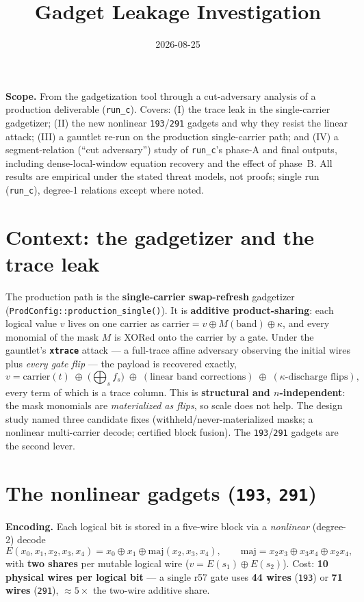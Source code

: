 \documentclass[11pt]{article}
\title{\bfseries Gadget Leakage Investigation}
\author{}
\date{2026-08-25}
\newcommand{\xor}{\oplus}
\newcommand{\code}[1]{\texttt{#1}}
\newcommand{\maj}{\mathrm{maj}}
\begin{document}
\maketitle
\vspace{-3em}

\noindent\textbf{Scope.} From the gadgetization tool through a cut-adversary
analysis of a production deliverable (\code{run\_c}). Covers: (I) the trace leak in
the single-carrier gadgetizer; (II) the new nonlinear \code{193}/\code{291} gadgets
and why they resist the linear attack; (III) a gauntlet re-run on the production
single-carrier path; and (IV) a segment-relation (``cut adversary'') study of
\code{run\_c}'s phase-A and final outputs, including dense-local-window equation
recovery and the effect of phase~B. All results are empirical under the stated
threat models, not proofs; single run (\code{run\_c}), degree-1 relations except
where noted.

\section{Context: the gadgetizer and the trace leak}

The production path is the \textbf{single-carrier swap-refresh} gadgetizer
(\code{ProdConfig::production\_single()}). It is \textbf{additive product-sharing}:
each logical value $v$ lives on one carrier as $\text{carrier} = v \xor M(\text{band})
\xor \kappa$, and every monomial of the mask $M$ is XORed onto the carrier by a gate.
Under the gauntlet's \textbf{\code{xtrace}} attack --- a full-trace affine adversary
observing the initial wires plus \emph{every gate flip} --- the payload is recovered
exactly,
\[
v = \text{carrier}(t) \;\xor\; \Big(\bigoplus_s f_s\Big) \;\xor\; (\text{linear band
corrections}) \;\xor\; (\kappa\text{-discharge flips}),
\]
every term of which is a trace column. This is \textbf{structural and
$n$-independent}: the mask monomials are \emph{materialized as flips}, so scale does
not help. The design study named three candidate fixes (withheld/never-materialized
masks; a nonlinear multi-carrier decode; certified block fusion). The
\code{193}/\code{291} gadgets are the second lever.

\section{The nonlinear gadgets (\code{193}, \code{291})}

\textbf{Encoding.} Each logical bit is stored in a five-wire block via a
\emph{nonlinear} (degree-2) decode
\[
E(x_0,x_1,x_2,x_3,x_4) = x_0 \xor x_1 \xor \maj(x_2,x_3,x_4), \qquad
\maj = x_2x_3 \xor x_3x_4 \xor x_2x_4,
\]
with \textbf{two shares} per mutable logical wire ($v = E(s_1)\xor E(s_2)$). Cost:
\textbf{10 physical wires per logical bit} --- a single r57 gate uses \textbf{44
wires} (\code{193}) or \textbf{71 wires} (\code{291}), $\approx 5\times$ the two-wire
additive share.
\end{document}
